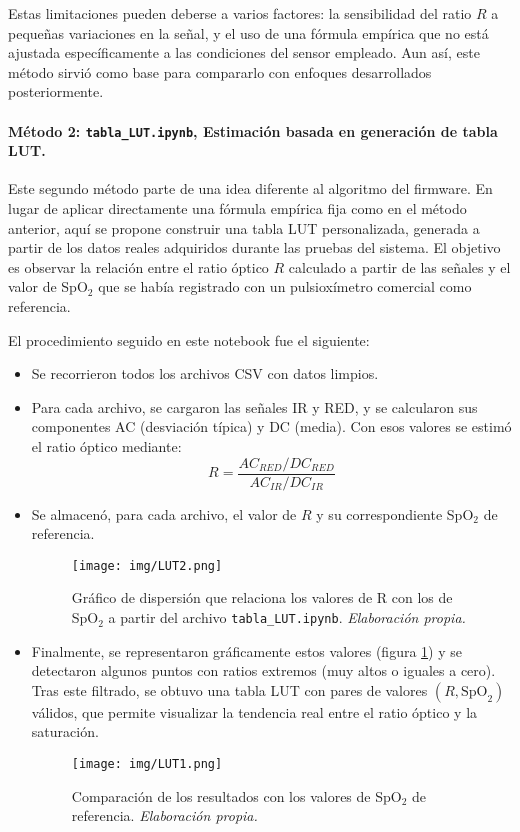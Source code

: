 Estas limitaciones pueden deberse a varios factores: la sensibilidad del ratio \( R \) a pequeñas variaciones en la señal, y el uso de una fórmula empírica que no está ajustada específicamente a las condiciones del sensor empleado. Aun así, este método sirvió como base para compararlo con enfoques desarrollados posteriormente.


\paragraph{Método 2: \texttt{tabla\_LUT.ipynb}, Estimación basada en generación de tabla LUT.}

Este segundo método parte de una idea diferente al algoritmo del firmware. En lugar de aplicar directamente una fórmula empírica fija como en el método anterior, aquí se propone construir una tabla LUT personalizada, generada a partir de los datos reales adquiridos durante las pruebas del sistema. El objetivo es observar la relación entre el ratio óptico \(R\) calculado a partir de las señales y el valor de SpO$_2$ que se había registrado con un pulsioxímetro comercial como referencia.

El procedimiento seguido en este notebook fue el siguiente:

\begin{itemize}
    \item Se recorrieron todos los archivos CSV con datos limpios.
    \item Para cada archivo, se cargaron las señales IR y RED, y se calcularon sus componentes AC (desviación típica) y DC (media). Con esos valores se estimó el ratio óptico mediante:
    \begin{equation}
    R = \frac{AC_{RED} / DC_{RED}}{AC_{IR} / DC_{IR}}
    \end{equation}
    \item Se almacenó, para cada archivo, el valor de \(R\) y su correspondiente SpO$_2$ de referencia.
    \begin{figure}[H]
        \centering
        \texttt{[image: img/LUT2.png]}
        \caption{Gráfico de dispersión que relaciona los valores de R con los de SpO$_2$ a partir del archivo \texttt{tabla\_LUT.ipynb}. \textit{Elaboración propia.}}
        \label{fig:LUT2}
    \end{figure}
    \item Finalmente, se representaron gráficamente estos valores (figura \ref{fig:LUT2}) y se detectaron algunos puntos con ratios extremos (muy altos o iguales a cero). Tras este filtrado, se obtuvo una tabla LUT con pares de valores \((R, \text{SpO}_2)\) válidos, que permite visualizar la tendencia real entre el ratio óptico y la saturación.
    \begin{figure}[H]
        \centering
        \texttt{[image: img/LUT1.png]}
        \caption{Comparación de los resultados con los valores de SpO$_2$ de referencia. \textit{Elaboración propia.}}
        \label{fig:LUT1}
    \end{figure}
\end{itemize}


